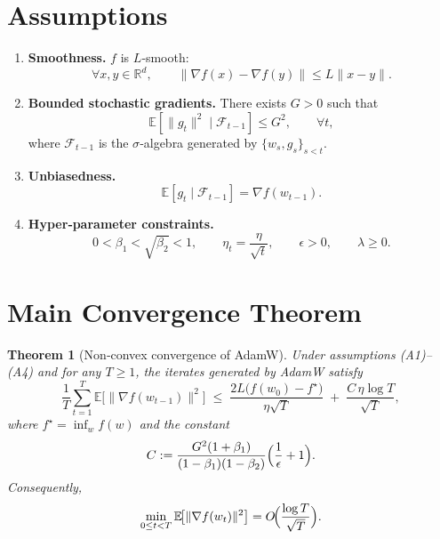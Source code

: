\documentclass{article}
\newtheorem{theorem}{Theorem}
\newcommand{\EE}{\mathbb{E}}
\newcommand{\RR}{\mathbb{R}}
\begin{document}
\section*{Assumptions}
\begin{enumerate}[label=(A\arabic*)]
    \item \textbf{Smoothness.} $f$ is $L$‑smooth:
    \[
    \forall x,y\in\RR^{d},\qquad
    \|\nabla f(x)-\nabla f(y)\| \le L\|x-y\|.
    \tag{A1}
    \]
    \item \textbf{Bounded stochastic gradients.} There exists $G>0$ such that
    \[
    \EE\!\left[\|g_t\|^2\mid \mathcal{F}_{t-1}\right]\le G^2,\qquad
    \forall t,
    \tag{A2}
    \]
    where $\mathcal{F}_{t-1}$ is the $\sigma$‑algebra generated by $\{w_s,g_s\}_{s< t}$.
    \item \textbf{Unbiasedness.}
    \[
    \EE\!\left[g_t\mid \mathcal{F}_{t-1}\right]=\nabla f(w_{t-1}).
    \tag{A3}
    \]
    \item \textbf{Hyper‑parameter constraints.}
    \[
    0<\beta_1<\sqrt{\beta_2}<1,\qquad
    \eta_t=\frac{\eta}{\sqrt{t}},\qquad
    \epsilon>0,\qquad
    \lambda\ge0.
    \tag{A4}
    \]
\end{enumerate}

\section*{Main Convergence Theorem}
\begin{theorem}[Non‑convex convergence of AdamW]\label{thm:adamw}
Under assumptions (A1)–(A4) and for any $T\ge1$, the iterates generated by AdamW satisfy
\[
\frac{1}{T}\sum_{t=1}^{T}\EE\!\big[\|\nabla f(w_{t-1})\|^2\big]
\;\le\;
\frac{2L\big(f(w_0)-f^\star\big)}{\eta\sqrt{T}}
\;+\;
\frac{C\,\eta\log T}{\sqrt{T}},
\]
where $f^\star=\inf_{w}f(w)$ and the constant
\[
C:=\frac{G^2(1+\beta_1)}{(1-\beta_1)(1-\beta_2)}\Bigl(\frac{1}{\epsilon}+1\Bigr).
\]
Consequently,
\[
\min_{0\le t<T}\EE\!\big[\|\nabla f(w_t)\|^2\big]=O\!\Bigl(\frac{\log T}{\sqrt{T}}\Bigr).
\]
\end{theorem}

\end{document}
